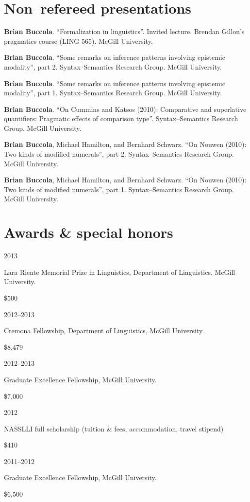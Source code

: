 \documentclass[11pt,letterpaper]{article}
\newcommand{\name}{Brian Buccola}
\newcommand{\cvitem}[2]{%
  \begin{minipage}[t]{0.24\textwidth}
    #1 %
  \end{minipage}
  \hfill
  \begin{minipage}[t]{0.74\textwidth}
    #2 %
  \end{minipage}
}
\newcommand{\award}[2]{%
  \begin{minipage}[t]{0.78\textwidth}
    #1        %
  \end{minipage}
  \hfill
  \begin{minipage}[t]{0.20\textwidth}
    \hfill #2 %
  \end{minipage}
}
\begin{document}
\section*{Non--refereed presentations}

\cvitem{}{\textbf{\name}. ``Formalization in
linguistics''. Invited lecture. Brendan Gillon's pragmatics course (LING 565).
McGill University.}

\cvitem{}{\textbf{\name}. ``Some remarks on inference
patterns involving epistemic modality'', part 2. Syntax--Semantics Research
Group.  McGill University.}

\cvitem{}{\textbf{\name}. ``Some remarks on inference
patterns involving epistemic modality'', part 1. Syntax--Semantics Research
Group.  McGill University.}

\cvitem{}{\textbf{\name}. ``On Cummins and Katsos
(2010): Comparative and superlative quantifiers: Pragmatic effects of
comparison type''.  Syntax--Semantics Research Group. McGill University.}

\cvitem{}{\textbf{\name}, Michael Hamilton, and
Bernhard Schwarz.  ``On Nouwen (2010): Two kinds of modified numerals'', part
2.  Syntax--Semantics Research Group. McGill University.}

\cvitem{}{\textbf{\name}, Michael Hamilton, and Bernhard
Schwarz.  ``On Nouwen (2010): Two kinds of modified numerals'', part 1.
Syntax--Semantics Research Group. McGill University.}



\section*{Awards \& special honors}

\cvitem{2013}{\award{Lara Riente Memorial Prize in Linguistics, Department of
Linguistics, McGill University.}{\$500}}

\cvitem{2012--2013}{\award{Cremona Fellowship, Department of Linguistics, McGill
University.}{\$8,479}}

\cvitem{2012--2013}{\award{Graduate Excellence Fellowship, McGill
University.}{\$7,000}}

\cvitem{2012}{\award{NASSLLI full scholarship (tuition \& fees, accommodation,
travel stipend)}{\$410}}

\cvitem{2011--2012}{\award{Graduate Excellence Fellowship, McGill
University.}{\$6,500}}
\end{document}
